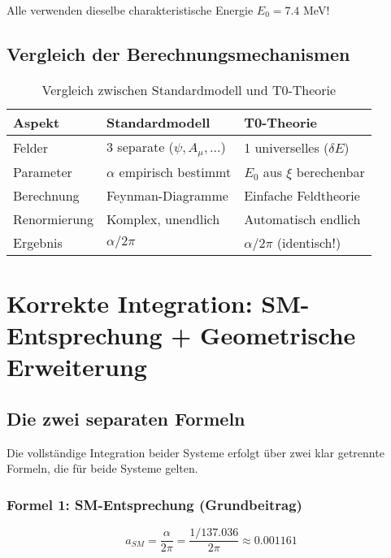 \documentclass[12pt,a4paper]{article}
\numberwithin{equation}{section}
\newcommand{\xipar}{\xi}
\begin{document}
	Alle verwenden dieselbe charakteristische Energie $E_0 = 7.4$ MeV!
	
	\subsection{Vergleich der Berechnungsmechanismen}
	
	\begin{table}[H]
		\centering
		\begin{tabular}{lll}
			\toprule
			\textbf{Aspekt} & \textbf{Standardmodell} & \textbf{T0-Theorie} \\
			\midrule
			Felder & 3 separate ($\psi, A_\mu, \ldots$) & 1 universelles ($\delta E$) \\
			Parameter & $\alpha$ empirisch bestimmt & $E_0$ aus $\xipar$ berechenbar \\
			Berechnung & Feynman-Diagramme & Einfache Feldtheorie \\
			Renormierung & Komplex, unendlich & Automatisch endlich \\
			Ergebnis & $\alpha/2\pi$ & $\alpha/2\pi$ (identisch!) \\
			\bottomrule
		\end{tabular}
		\caption{Vergleich zwischen Standardmodell und T0-Theorie}
		\label{tab:comparison}
	\end{table}
	
	\section{Korrekte Integration: SM-Entsprechung + Geometrische Erweiterung}
	
	\subsection{Die zwei separaten Formeln}
	
	Die vollständige Integration beider Systeme erfolgt über zwei klar getrennte Formeln, die für beide Systeme gelten.
	
	\subsubsection{Formel 1: SM-Entsprechung (Grundbeitrag)}
	
	\begin{equation}
		\label{eq:sm_basic}
		a_{SM} = \frac{\alpha}{2\pi} = \frac{1/137.036}{2\pi} \approx 0.001161
	\end{equation}
	
\end{document}
